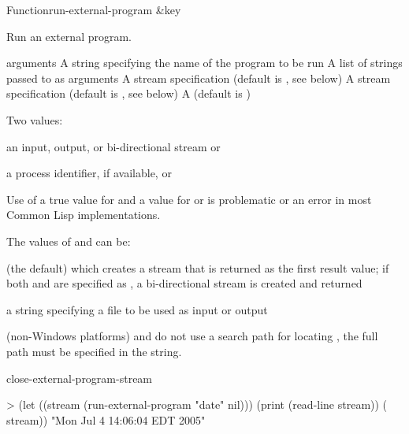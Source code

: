 \documentclass[10pt,twoside,english,pdftex]{article}
\begin{document}
\begin{functiondoc}{Function}{run-external-program}{
  \&key 
  \mbox{\returns{} }}
%
%

\fnsyntax

\fnpurpose Run an external program.

\fnpackage {}

\fnmodule {}

\fnargs
\begin{args}{arguments}
\arg[program] A string specifying the name of the program to be run
\arg[arguments] A list of strings passed to  as arguments
\arg[input] A stream specification (default is , see below)
\arg[output] A stream specification (default is , see below)
\arg[wait] A  (default is \nil)
\end{args}

\fnreturns Two values:
\begin{tightitemize}
\item an input, output, or bi-directional stream or \nil{}
\item a process identifier, if available, or \nil{}
\end{tightitemize}
  
\fnerrors
Use of a true value for  and a  value for
 or  is problematic or an error in most
Common Lisp implementations.

\fndescription
The values of  and  can be:
\begin{tightitemize}
\item {} (the default) which creates a stream that is
  returned as the first result value; if both  and
   are specified as , a bi-directional
  stream is created and returned
\item a string specifying a file to be used as input or output
\end{tightitemize}

 (non-Windows platforms) and
 do not use a search path for
locating , the full path must be specified in the 
string.

\begin{alsos}{close-external-program-stream}
\end{alsos}

%
\fnexample
%
\W\supp
\begin{example}
> (let ((stream (run-external-program "date" nil)))
     (print (read-line stream))
     ( stream))
"Mon Jul  4 14:06:04 EDT 2005" 
\end{example}

\end{functiondoc}
\end{document}

